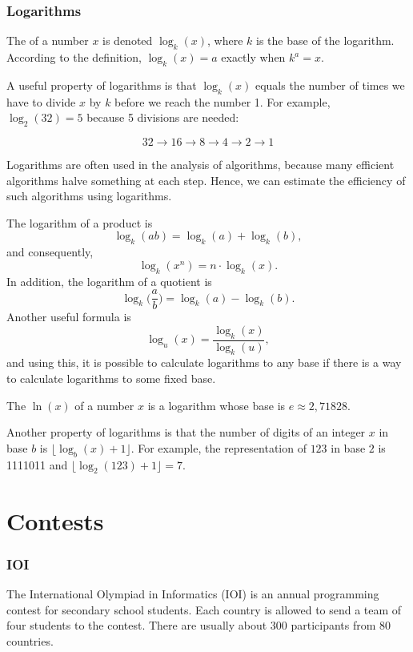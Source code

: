 \subsubsection{Logarithms}


The  of a number $x$
is denoted $\log_k(x)$, where $k$ is the base
of the logarithm.
According to the definition,
$\log_k(x)=a$ exactly when $k^a=x$.

A useful property of logarithms is
that $\log_k(x)$ equals the number of times
we have to divide $x$ by $k$ before we reach 
the number 1.
For example, $\log_2(32)=5$
because 5 divisions are needed:

\[32 \rightarrow 16 \rightarrow 8 \rightarrow 4 \rightarrow 2 \rightarrow 1 \]

Logarithms are often used in the analysis of
algorithms, because many efficient algorithms
halve something at each step.
Hence, we can estimate the efficiency of such algorithms
using logarithms.

The logarithm of a product is
\[\log_k(ab) = \log_k(a)+\log_k(b),\]
and consequently,
\[\log_k(x^n) = n \cdot \log_k(x).\]
In addition, the logarithm of a quotient is
\[\log_k\Big(\frac{a}{b}\Big) = \log_k(a)-\log_k(b).\]
Another useful formula is
\[\log_u(x) = \frac{\log_k(x)}{\log_k(u)},\]
and using this, it is possible to calculate
logarithms to any base if there is a way to
calculate logarithms to some fixed base.


The  $\ln(x)$ of a number $x$
is a logarithm whose base is $e \approx 2{,}71828$.

Another property of logarithms is that
the number of digits of an integer $x$ in base $b$ is
$\lfloor \log_b(x)+1 \rfloor$.
For example, the representation of
$123$ in base $2$ is 1111011 and
$\lfloor \log_2(123)+1 \rfloor = 7$.

\section{Contests}

\subsubsection{IOI}

The International Olympiad in Informatics (IOI) \cite{ioi}
is an annual programming contest for
secondary school students.
Each country is allowed to send a team of
four students to the contest.
There are usually about 300 participants
from 80 countries.

